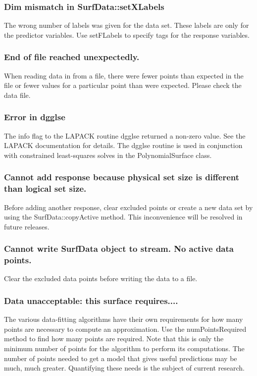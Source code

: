 \documentclass{article}
\begin{document}
\subsubsection{Dim mismatch in SurfData::setXLabels}
The wrong number of labels was given for the data set.  These labels are only
for the predictor variables.  Use setFLabels to specify tags for the response
variables.

\subsubsection{End of file reached unexpectedly.}
When reading data in from a file, there were fewer points than expected in the
file or fewer values for a particular point than were expected.  Please check
the data file.

\subsubsection{Error in dgglse}
The info flag to the LAPACK routine dgglse returned a non-zero value.  See the
LAPACK documentation for details.  The dgglse routine is used in conjunction
with constrained least-squares solves in the PolynomialSurface class.

\subsubsection{Cannot add response because physical set size is different than logical set size.}
Before adding another response, clear excluded points or create a new data set
by using the SurfData::copyActive method.  This inconvenience will be resolved
in future releases.

\subsubsection{Cannot write SurfData object to stream.  No active data points.}
Clear the excluded data points before writing the data to a file.

\subsubsection{Data unacceptable: this surface requires....} 
The various data-fitting algorithms have their own requirements for how many
points are necessary to compute an approximation.  Use the numPointsRequired
method to find how many points are required.  Note that this is only the minimum
number of points for the algorithm to perform its computations.  The number of
points needed to get a model that gives useful predictions may be much, much
greater.  Quantifying these needs is the subject of current research.
\end{document}

